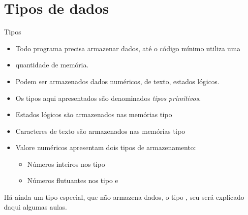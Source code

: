 \documentclass[11pt]{beamer}
\subtitle{Tipo assim\dots}
\begin{document}
\titlepage

\begin{frame}
	\tableofcontents
\end{frame}

\section{Tipos de dados}
	\begin{frame}{Tipos}
		\only<1>	
		{
			\begin{itemize}
				\presentationPause\item Todo programa precisa armazenar dados, até o código mínimo utiliza uma \presentationPause\item quantidade de memória.
				\presentationPause\item Podem ser armazenados dados numéricos, de texto, estados lógicos.
				\presentationPause\item Os tipos aqui apresentados são denominados \emph{tipos primitivos}.
			\end{itemize}
		}
		{
			\begin{itemize}
				\presentationPause\item Estados lógicos são armazenados nas memórias tipo 
				\presentationPause\item Caracteres de texto são armazenados nas memórias tipo 
				\presentationPause\item Valore numéricos apresentam dois tipos de armazenamento:
				\begin{itemize}
					\presentationPause\item Números inteiros nos tipo 
					\presentationPause\item Números flutuantes nos tipo  e 
				\end{itemize}
			\end{itemize}
			\presentationPause Há ainda um tipo especial, que não armazena dados, o tipo , seu será explicado daqui algumas aulas.
		}
	\end{frame}
\end{document}
